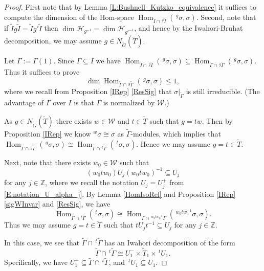 \documentclass[10pt, letterpaper]{amsart}
\theoremstyle{plain}
\theoremstyle{definition}
\numberwithin{equation}{section}
\newcommand{\Z}{\mathbb{Z}}
\newcommand{\Gt}{\widetilde{G}}
\newcommand{\It}{\widetilde{I}}
\newcommand{\Tt}{\widetilde{T}}
\newcommand{\Gammat}{\widetilde{\Gamma}}
\newcommand{\Hom}{\operatorname{Hom}}
\newcommand{\Wcal}{\mathcal{W}}
\newcommand{\Hcal}{\mathcal{H}}
\begin{document}
\begin{proof}
	First note that by Lemma \ref{L:Bushnell_Kutzko_equivalence} it suffices to compute the dimension of the Hom-space $\Hom_{\It\cap\,^{g}\It}(\,^{g}\sigma,\sigma)$. Second, note that if $\It g\It=\It g'\It$ then $\dim\Hcal_{g^{-1}}=\dim\Hcal_{{g'}^{-1}}$, and hence by the Iwahori-Bruhat decomposition, we may assume $g\in N_{\Gt}(\Tt)$.
	
	Let $\Gamma:=\Gamma(1)$. Since $ \Gamma\subseteq I$ we have $\Hom_{\It\cap\,^{g}\It}(\,^{g}\sigma,\sigma)\subseteq \Hom_{\widetilde{\Gamma}\cap\,^{g}\widetilde{\Gamma}}(\,^{g}\sigma,\sigma)$. Thus it suffices to prove 
    \[
    \dim\Hom_{\widetilde{\Gamma}\cap\,^{g}\widetilde{\Gamma}}(\,^{g}\sigma,\sigma)\leq 1,
    \]
    where we recall from Proposition \ref{IRep} \eqref{ResSig} that $\sigma|_{\Gammat}$ is still irreducible. (The advantage of $\Gamma$ over $I$ is that $\Gamma$ is normalized by $\Wcal$.)
	
	As $g\in N_{\Gt}(\Tt)$ there exists $w\in \Wcal$ and $t\in \Tt$ such that $g=tw$. Then by Proposition \ref{IRep} we know $^w\sigma\cong\sigma$ as $\Gammat$-modules, which implies that $\Hom_{\widetilde{\Gamma}\cap\,^{g}\widetilde{\Gamma}}(\,^{g}\sigma,\sigma)\cong \Hom_{\widetilde{\Gamma}\cap\,^{t}\widetilde{\Gamma}}(\,^{t}\sigma,\sigma)$. Hence we may assume $g=t\in\Tt$.
	
	Next, note that there exists $w_{0}\in\Wcal$ such that 
    \[
    (w_0tw_0)U_j(w_0tw_0)^{-1}\subseteq U_j
    \]
    for any $j\in\Z$, where we recall the notation $U_j=U_j^+$ from \eqref{E:notation_U_alpha_j}. By Lemma \ref{HomIsoRel} and Proposition \ref{IRep} \eqref{sigWInvar} and \eqref{ResSig}, we have
	\begin{equation*}
		\Hom_{\widetilde{\Gamma}\cap\,^{t}\widetilde{\Gamma}}(\,^{t}\sigma,\sigma)\cong \Hom_{\widetilde{\Gamma}\cap\,^{w_{0}tw_{0}^{-1}}\widetilde{\Gamma}}(\,^{w_{0}tw_{0}^{-1}}\sigma,\sigma).
	\end{equation*}
	Thus we may assume $g=t\in \Tt$ such that $tU_{j}t^{-1}\subseteq U_{j}$ for any $j\in \mathbb{Z}$. 
	
	In this case, we see that $\widetilde{\Gamma}\cap\,^{t}\widetilde{\Gamma}$ has an Iwahori decomposition of the form
	\begin{equation*}
		\widetilde{\Gamma}\cap\,^{t}\widetilde{\Gamma}\cong U^{-}_{1}\times \Tt_{1} \times \,^{t}U_{1}.
	\end{equation*}
	Specifically, we have $U^{-}_{1}\subseteq \widetilde{\Gamma}\cap\,^{t}\widetilde{\Gamma}$, and $\,^{t}U_{1}\subseteq U_{1}$.
	

\end{proof}
\end{document}

